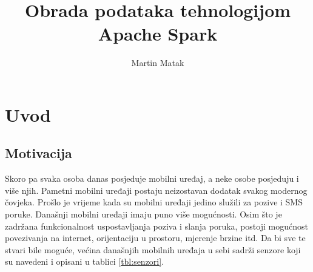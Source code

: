 \documentclass[times, utf8, zavrsni, numeric]{fer}
\begin{document}

\title{Obrada podataka tehnologijom Apache Spark}

\author{Martin Matak}

\maketitle



\tableofcontents

\chapter{Uvod}
\section{Motivacija}
Skoro pa svaka osoba danas posjeduje mobilni uređaj, a neke osobe posjeduju i više njih. Pametni mobilni uređaji postaju neizostavan dodatak svakog modernog čovjeka. Prošlo je vrijeme kada su mobilni uređaji jedino služili za pozive i SMS poruke. Današnji mobilni uređaji imaju puno više mogućnosti. Osim što je zadržana funkcionalnost uspostavljanja poziva i slanja poruka, postoji mogućnost povezivanja na internet, orijentaciju u prostoru, mjerenje brzine itd. Da bi sve te stvari bile moguće, većina današnjih mobilnih uređaja u sebi sadrži senzore koji su navedeni i opisani u tablici \ref{tbl:senzori}.
\end{document}
